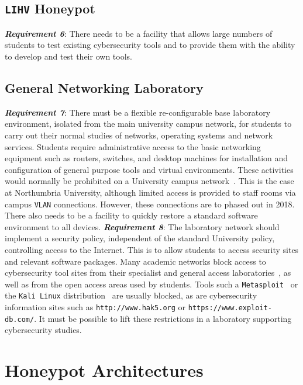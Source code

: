 \documentclass{ieeeaccess}
\begin{document}
\subsection{\texttt{LIHV} Honeypot}\label{subsec:LabHoneypot}

\noindent\textit{\textbf{Requirement 6}}:
There needs to be a facility that allows large numbers of students to test
existing cybersecurity tools and to provide them with the ability to develop
and test their own tools.

\subsection{General Networking Laboratory}\label{subsec:GeneralLab}

\noindent\textit{\textbf{Requirement 7}}: There must be a flexible re-configurable base laboratory environment, isolated from the main university campus network, for students to carry out their normal
studies of networks, operating systems and network services. Students require
administrative access to the basic networking equipment such as routers,
switches, and desktop machines for installation and configuration of general
purpose tools and virtual environments. These activities would normally be
prohibited on a University campus network~\cite{MGDL:13}. This is the case at Northumbria University, although limited access is provided to staff rooms via campus \texttt{VLAN} connections. However, these connections are to phased out in 2018. There also needs to be a facility to quickly restore a standard software environment to all devices.
\newline\newline
\noindent\textit{\textbf{Requirement 8}}: The laboratory network should implement a security policy, independent of the
standard University policy, controlling access to the Internet. This is to
allow students to access security sites and relevant software packages. Many
academic networks block access to cybersecurity tool sites from their
specialist and general access laboratories~\cite{ACGO:06,YYLCHJ:04}, as well as
from the open access areas used by students. Tools such a
\texttt{Metasploit}~\cite{R7:17} or the \texttt{Kali Linux}
distribution~\cite{OS:17} are usually blocked, as are cybersecurity information
sites such as \texttt{http://www.hak5.org} or
\texttt{https://www.exploit-db.com/}. It must be possible to lift these
restrictions in a laboratory supporting cybersecurity studies.

\section{Honeypot Architectures}\label{sec:HoneyArch}
\end{document}
